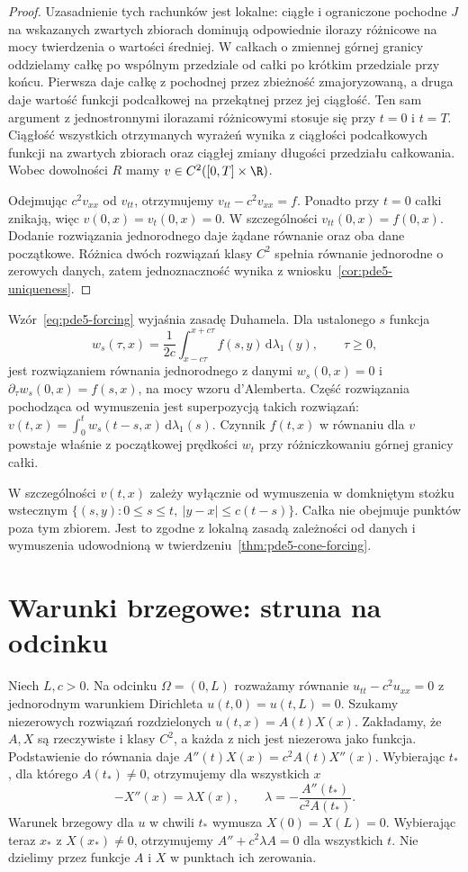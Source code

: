 \begin{proof}
Uzasadnienie tych rachunków jest lokalne:
ciągłe i ograniczone pochodne $J$ na wskazanych
zwartych zbiorach dominują odpowiednie ilorazy
różnicowe na mocy twierdzenia o wartości średniej.
W całkach o zmiennej górnej granicy oddzielamy
całkę po wspólnym przedziale od całki po krótkim
przedziale przy końcu. Pierwsza daje całkę
z pochodnej przez zbieżność zmajoryzowaną,
a druga daje wartość funkcji podcałkowej na
przekątnej przez jej ciągłość.
Ten sam argument z jednostronnymi ilorazami
różnicowymi stosuje się przy $t=0$ i $t=T$.
Ciągłość wszystkich otrzymanych wyrażeń
wynika z ciągłości podcałkowych funkcji
na zwartych zbiorach oraz ciągłej zmiany długości
przedziału całkowania. Wobec dowolności $R$
mamy $v\in C^2([0,T]\times\R)$.

Odejmując $c^2v_{xx}$ od $v_{tt}$, otrzymujemy
$v_{tt}-c^2v_{xx}=f$. Ponadto przy $t=0$
całki znikają, więc $v(0,x)=v_t(0,x)=0$.
W szczególności $v_{tt}(0,x)=f(0,x)$.
Dodanie rozwiązania jednorodnego daje
żądane równanie oraz oba dane początkowe.
Różnica dwóch rozwiązań klasy $C^2$ spełnia
równanie jednorodne o zerowych danych,
zatem jednoznaczność wynika z
wniosku~\ref{cor:pde5-uniqueness}.
\end{proof}

Wzór~\eqref{eq:pde5-forcing} wyjaśnia zasadę
Duhamela. Dla ustalonego $s$ funkcja
\[
 w_s(\tau,x)=\frac1{2c}
 \int_{x-c\tau}^{x+c\tau}f(s,y)\,\mathrm d\lambda_1(y),
 \qquad \tau\geq0,
\]
jest rozwiązaniem równania jednorodnego
z danymi $w_s(0,x)=0$ i
$\partial_\tau w_s(0,x)=f(s,x)$,
na mocy wzoru d'Alemberta.
Część rozwiązania pochodząca od wymuszenia
jest superpozycją takich rozwiązań:
$v(t,x)=\int_0^t w_s(t-s,x)\,\mathrm d\lambda_1(s)$.
Czynnik $f(t,x)$ w równaniu dla $v$
powstaje właśnie z początkowej prędkości $w_t$
przy różniczkowaniu górnej granicy całki.

W szczególności $v(t,x)$ zależy wyłącznie
od wymuszenia w domkniętym stożku wstecznym
$\{(s,y):0\leq s\leq t,\ |y-x|\leq c(t-s)\}$.
Całka nie obejmuje punktów poza tym zbiorem.
Jest to zgodne z lokalną zasadą zależności
od danych i wymuszenia udowodnioną w
twierdzeniu~\ref{thm:pde5-cone-forcing}.

\section{Warunki brzegowe: struna na odcinku}
\label{sec:pde5-string}

Niech $L,c>0$. Na odcinku $\Omega=(0,L)$
rozważamy równanie $u_{tt}-c^2u_{xx}=0$
z jednorodnym warunkiem Dirichleta
$u(t,0)=u(t,L)=0$. Szukamy niezerowych
rozwiązań rozdzielonych $u(t,x)=A(t)X(x)$.
Zakładamy, że $A,X$ są rzeczywiste i klasy $C^2$,
a każda z nich jest niezerowa jako funkcja.
Podstawienie do równania daje
$A''(t)X(x)=c^2 A(t)X''(x)$.
Wybierając $t_*$, dla którego $A(t_*)\ne0$,
otrzymujemy dla wszystkich $x$
\[
 -X''(x)=\lambda X(x),\qquad
 \lambda=-\frac{A''(t_*)}{c^2A(t_*)}.
\]
Warunek brzegowy dla $u$ w chwili $t_*$
wymusza $X(0)=X(L)=0$.
Wybierając teraz $x_*$ z $X(x_*)\ne0$,
otrzymujemy $A''+c^2\lambda A=0$
dla wszystkich $t$. Nie dzielimy przez funkcje
$A$ i $X$ w punktach ich zerowania.

